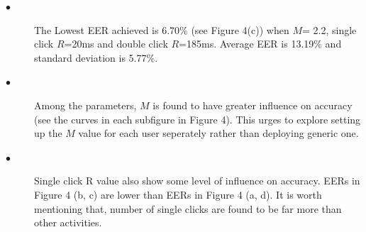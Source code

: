 \documentclass[conference]{IEEEtran}
\begin{document}
\begin{description}
  \item[$\bullet$] The Lowest EER achieved is 6.70\% (see Figure 4(c)) when $M$= 2.2, single click $R$=20ms and double click $R$=185ms. Average EER is 13.19\% and standard deviation is 5.77\%. 
  \item[$\bullet$] Among the parameters, $M$ is found to have greater influence on accuracy (see the curves in each subfigure in Figure 4). This urges to explore setting up the $M$ value for each user seperately rather than deploying generic one.
  \item[$\bullet$] Single click R value also show some level of influence on accuracy. EERs in Figure 4 (b, c) are lower than EERs in Figure 4 (a, d). It is worth mentioning that, number of single clicks are found to be far more than other activities.        

\end{description} 


\begin{table}[t]
\def\arraystretch{1.5}
\end{table}
\end{document}
